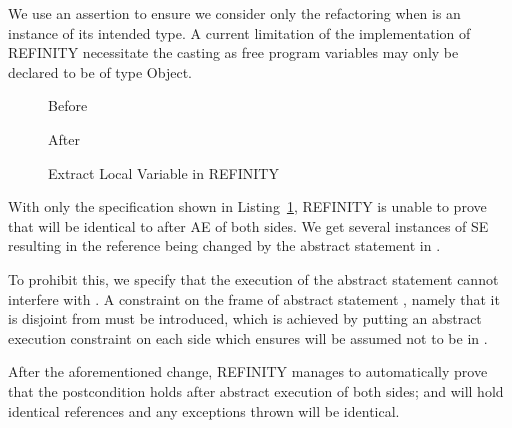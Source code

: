 We use an assertion to ensure we consider only the refactoring when  is an instance of its intended type.
A current limitation of the implementation of REFINITY necessitate the casting  as free program variables may only be declared to be of type Object.
\begin{figure}[tbp]
  \captionsetup{type=lstlisting}
  \centering
  \begin{sublstlisting}[b]{.34\linewidth}
    
    \vspace{-2mm}
    \caption{Before}
    \label{lst:ExtractVariable-refinity-before}
  \end{sublstlisting}\hspace{1cm}
  \begin{sublstlisting}[b]{.34\linewidth}
    
    \vspace{-2mm}
    \caption{After}
    \label{lst:ExtractVariable-refinity-after}
  \end{sublstlisting}\vspace{4mm}
\caption{Extract Local Variable in REFINITY}
\label{lst:ExtractVariable-refinity}
\end{figure}
With only the specification shown in Listing~\ref{lst:ExtractVariable-refinity}, REFINITY is unable to prove that  will be identical to  after AE of both sides.
We get several instances of SE resulting in the reference  being changed by the abstract statement  in .

To prohibit this, we specify that the execution of the abstract statement  cannot interfere with .
A constraint on the frame  of abstract statement ,
namely that it is disjoint from  must be introduced, which is
achieved by putting an abstract execution constraint  on each side which ensures 
will be assumed not to be in .

After the aforementioned change, REFINITY manages to automatically prove that the postcondition holds after abstract execution of both sides;
 and  will hold identical references and any exceptions thrown will be identical.

